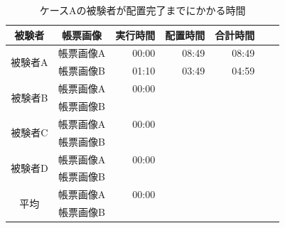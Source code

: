 \begin{table}[t]
	\caption{ケースAの被験者が配置完了までにかかる時間}
	\label{tb:result_caseA_time}
	\centering
	\begin{tabular}{cc||rrrr|r}
		被験者 & 帳票画像 & 実行時間 & 配置時間 & 合計時間 \\
        \hline \hline

		\multirow{2}{*}{被験者A} & 帳票画像A & 00:00 & 08:49 & 08:49 \\
		                        & 帳票画像B & 01:10 & 03:49 & 04:59 \\
                                \hline

		\multirow{2}{*}{被験者B} & 帳票画像A & 00:00 &  &  \\
                                & 帳票画像B &  &  &  \\
                                \hline

		\multirow{2}{*}{被験者C} & 帳票画像A & 00:00 &  &  \\
                                & 帳票画像B & &  &  \\
                                \hline

		\multirow{2}{*}{被験者D} & 帳票画像A & 00:00 &  &  \\
                                & 帳票画像B & &  &  \\
                                \hline \hline

		\multirow{2}{*}{平均}  & 帳票画像A & 00:00 &  &  \\
                              & 帳票画像B &  &  &  \\
	\end{tabular}
\end{table}

